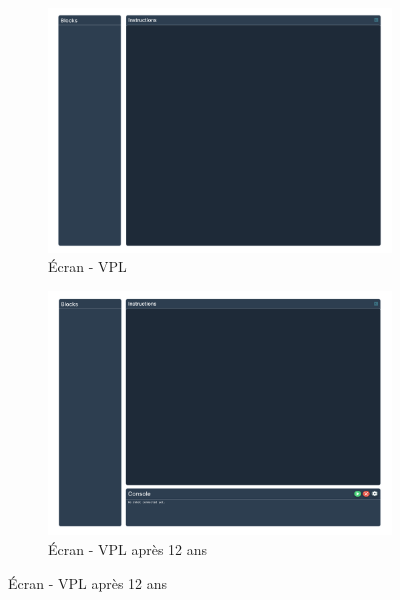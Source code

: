 \begin{figure}[H]
    \begin{subfigure}{0.45\linewidth}
        \centering
        \includegraphics[width=\linewidth]{figures//VPL.png}
        \caption{\label{fig:vpl} Écran - VPL}
    \end{subfigure}
    \hfill
    \begin{subfigure}{0.45\linewidth}
        \centering
        \includegraphics[width=\linewidth]{figures//VPL advanced.png}
        \caption{\label{fig:vpl_advanced} Écran - VPL après 12 ans}
    \end{subfigure}

    \vspace{0.5cm}


\end{figure}
